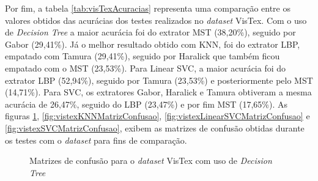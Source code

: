 \par Por fim, a tabela \autoref{tab:visTexAcuracias} representa uma comparação entre os valores obtidos das acurácias dos testes realizados no \textit{dataset} VisTex. Com o uso de \textit{Decision Tree} a maior acurácia foi do extrator MST (38,20\%), seguido por Gabor (29,41\%). Já o melhor resultado obtido com KNN, foi do extrator LBP, empatado com Tamura (29,41\%), seguido por Haralick que também ficou empatado com o MST (23,53\%). Para Linear SVC, a maior acurácia foi do extrator LBP (52,94\%), seguido por Tamura (23,53\%) e posteriormente pelo MST (14,71\%). Para SVC, os extratores Gabor, Haralick e Tamura obtiveram a mesma acurácia de 26,47\%, seguido do LBP (23,47\%) e por fim MST (17,65\%). As figuras \ref{fig:vistexDecisionTreeMatrizConfusao}, \ref{fig:vistexKNNMatrizConfusao}, \ref{fig:vistexLinearSVCMatrizConfusao} e \ref{fig:vistexSVCMatrizConfusao}, exibem as matrizes de confusão obtidas durante os testes com o \textit{dataset} para fins de comparação.



\begin{figure}[H]
    \centering
    \caption{Matrizes de confusão para o \textit{dataset} VisTex com uso de \textit{Decision Tree}}
    \qquad
    \label{fig:vistexDecisionTreeMatrizConfusao}
\end{figure}

